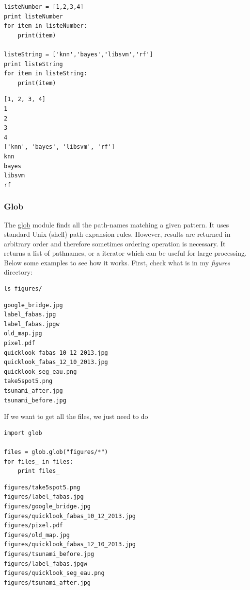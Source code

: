 \documentclass[a4paper,11pt,DIV=18]{scrartcl}
\begin{document}
\begin{verbatim}
listeNumber = [1,2,3,4]
print listeNumber
for item in listeNumber:
    print(item)

listeString = ['knn','bayes','libsvm','rf']
print listeString
for item in listeString:
    print(item)
\end{verbatim}

\begin{verbatim}
[1, 2, 3, 4]
1
2
3
4
['knn', 'bayes', 'libsvm', 'rf']
knn
bayes
libsvm
rf
\end{verbatim}

\subsubsection{Glob}
\label{sec:orgheadline54}
The \href{https://docs.python.org/2/library/glob.html}{glob} module finds all the  path-names matching a given pattern. It
uses standard Unix (shell) path  expansion rules. However, results are
returned in arbitrary order and therefore sometimes ordering operation
is necessary. It returns a list  of pathnames, or a iterator which can
be useful  for large  processing. Below  some examples  to see  how it
works. First, check what is in my \emph{figures} directory:

\begin{verbatim}
ls figures/
\end{verbatim}

\begin{verbatim}
google_bridge.jpg
label_fabas.jpg
label_fabas.jpgw
old_map.jpg
pixel.pdf
quicklook_fabas_10_12_2013.jpg
quicklook_fabas_12_10_2013.jpg
quicklook_seg_eau.png
take5spot5.png
tsunami_after.jpg
tsunami_before.jpg
\end{verbatim}

If we want to get all the files, we just need to do

\begin{verbatim}
import glob

files = glob.glob("figures/*")
for files_ in files:
    print files_
\end{verbatim}

\begin{verbatim}
figures/take5spot5.png
figures/label_fabas.jpg
figures/google_bridge.jpg
figures/quicklook_fabas_10_12_2013.jpg
figures/pixel.pdf
figures/old_map.jpg
figures/quicklook_fabas_12_10_2013.jpg
figures/tsunami_before.jpg
figures/label_fabas.jpgw
figures/quicklook_seg_eau.png
figures/tsunami_after.jpg
\end{verbatim}
\end{document}
